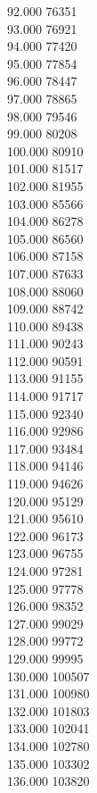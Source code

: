 { 92.000	76351 \\
 93.000	76921 \\
 94.000	77420 \\
 95.000	77854 \\
 96.000	78447 \\
 97.000	78865 \\
 98.000	79546 \\
 99.000	80208 \\
 100.000	80910 \\
 101.000	81517 \\
 102.000	81955 \\
 103.000	85566 \\
 104.000	86278 \\
 105.000	86560 \\
 106.000	87158 \\
 107.000	87633 \\
 108.000	88060 \\
 109.000	88742 \\
 110.000	89438 \\
 111.000	90243 \\
 112.000	90591 \\
 113.000	91155 \\
 114.000	91717 \\
 115.000	92340 \\
 116.000	92986 \\
 117.000	93484 \\
 118.000	94146 \\
 119.000	94626 \\
 120.000	95129 \\
 121.000	95610 \\
 122.000	96173 \\
 123.000	96755 \\
 124.000	97281 \\
 125.000	97778 \\
 126.000	98352 \\
 127.000	99029 \\
 128.000	99772 \\
 129.000	99995 \\
 130.000	100507 \\
 131.000	100980 \\
 132.000	101803 \\
 133.000	102041 \\
 134.000	102780 \\
 135.000	103302 \\
 136.000	103820 \\
}
